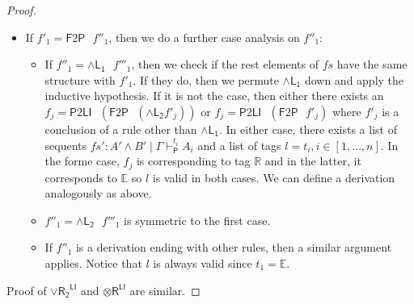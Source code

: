 \documentclass[submission,copyright,creativecommons]{eptcs}
\theoremstyle{definition}
\newcommand{\tr}{\otimes \mathsf{R}}
\newcommand{\andlone}{\land \mathsf{L_{1}}}
\newcommand{\andltwo}{\land \mathsf{L_{2}}}
\newcommand{\andli}{\land \mathsf{L}_{i}}
\newcommand{\andr}{\land \mathsf{R}}
\newcommand{\orrone}{\lor \mathsf{R_{1}}}
\newcommand{\orrtwo}{\lor \mathsf{R_{2}}}
\newcommand{\RI}{\mathsf{RI}}
\newcommand{\LI}{\mathsf{LI}}
\newcommand{\Pass}{\mathsf{P}}
\newcommand{\F}{\mathsf{F}}
\newcommand{\sw}{\mathsf{sw}}
\newcommand{\tR}{\mathbb{R}}
\newcommand{\tE}{\mathbb{E}}
\newcommand{\proofbox}[1]{\begin{tabular}{l} #1 \end{tabular}}
\begin{document}
\begin{proof}
\begin{itemize}
\begin{itemize}
\begin{itemize}
        The corresponding tag to $f'_j$ is $\tE$ because it is impossible to be a conclusion of any of $\andli$, so the validity of $l$ is justified.
        With $fs'$ and $l$ in hand, we define: 
        \begin{displaymath}
          \begin{array}{cc}
            \infer[\orrone^{\LI}]{- \mid A' , \Gamma \vdash_{\LI} A \lor B}{
              \deduce{- \mid A' , \Gamma \vdash_{\LI} A_i , i \in [1 , \dots , n]}{fs}
            }
            \\[10pt]
            &
            =
            \quad
            \proofbox{
            \infer[\sw]{- \mid A' , \Gamma \vdash_{\LI} A \lor B}{
              \infer[\orrone]{- \mid A' , \Gamma \vdash_{\F} A \lor B}{
                \infer[\andr^{*}_t]{- \mid A' , \Gamma \vdash^{l}_{\RI} A}{
                  \deduce{- \mid A' , \Gamma \vdash^{t_i}_{\Pass} A_i , i \in [1 , \dots , n]}{fs'}
                }
              }
            }
          }
          \end{array}
        \end{displaymath}
      \end{itemize}
      \item If $f'_1 = \F 2 \Pass \text{ } f''_1$, then we do a further case analysis on $f''_1$:
      \begin{itemize}
        \item If $f''_1 = \andlone \text{ } f'''_1$, then we check if the rest elements of $fs$ have the same structure with $f'_1$. If they do, then we permute $\andlone$ down and apply the inductive hypothesis.
        If it is not the case, then either there exists an $f_j = \Pass 2 \LI \text{ } (\F 2 \Pass \text{ } (\andltwo f'_j))$ or $f_j = \Pass 2 \LI \text{ } (\F 2 \Pass \text{ } f'_j)$ where $f'_j$ is a conclusion of a rule other than $\andlone$.
        In either case, there exists a list of sequents $fs' : A' \land B' \mid \Gamma \vdash^{t_i}_{\Pass} A_i$ and a list of tags $l = t_i , i \in [1 , \dots , n]$.
        In the forme case, $f_j$ is corresponding to tag $\tR$ and in the latter, it corresponds to $\tE$ so $l$ is valid in both cases.
        We can define a derivation analogously as above.
        \item $f''_1 = \andltwo \text{ } f'''_1$ is symmetric to the first case.
        \item If $f''_1$ is a derivation ending with other rules, then a similar argument applies.
        Notice that $l$ is always valid since $t_1 = \tE$.
      \end{itemize}
    \end{itemize} 
  \end{itemize}
  Proof of $\orrtwo^{\LI}$ and $\tr^{\LI}$ are similar.
\end{proof}
\end{document}
